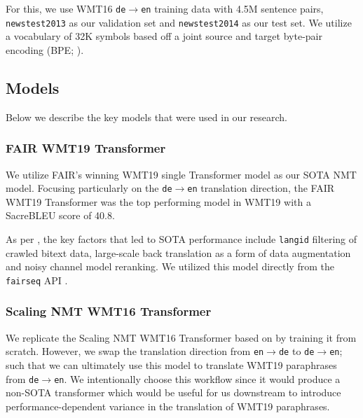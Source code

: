 \documentclass[11pt,a4paper]{article}
\begin{document}
For this, we use WMT16 \texttt{de$\rightarrow$en} training data with 4.5M sentence pairs, \texttt{newstest2013} as our validation set and \texttt{newstest2014} as our test set. We utilize a vocabulary of 32K symbols based off a joint source and target byte-pair encoding (BPE; \citealt{sennrich2015neural}).   


\subsection{Models}

Below we describe the key models that were used in our research.

\subsubsection{FAIR WMT19 Transformer}

We utilize FAIR's winning WMT19 single Transformer model as our SOTA NMT model. Focusing particularly on the \texttt{de$\rightarrow$en} translation direction, the FAIR WMT19 Transformer was the top performing model in WMT19 with a SacreBLEU \cite{post-2018-call} score of 40.8.

As per \citet{ng2019facebook}, the key factors that led to SOTA performance include \texttt{langid} filtering of crawled bitext data, large-scale back translation as a form of data augmentation and noisy channel model reranking. We utilized this model directly from the \texttt{fairseq} API \cite{ott2019fairseq}. 

\subsubsection{Scaling NMT WMT16 Transformer}

We replicate the Scaling NMT WMT16 Transformer based on \citet{ott2018scaling} by training it from scratch. However, we swap the translation direction from \texttt{en$\rightarrow$de} to \texttt{de$\rightarrow$en}; such that we can ultimately use this model to translate WMT19 paraphrases from \texttt{de$\rightarrow$en}. We intentionally choose this workflow since it would produce a non-SOTA transformer which would be useful for us downstream to introduce performance-dependent variance in the translation of WMT19 paraphrases.
\end{document}
